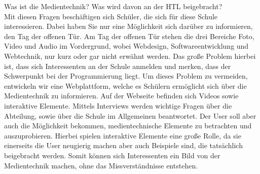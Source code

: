 
Was ist die Medientechnik? Was wird davon an der HTL beigebracht? \\
Mit diesen Fragen beschäftigen sich Schüler, die sich für diese Schule interessieren. Dabei haben Sie nur eine Möglichkeit sich darüber zu informieren, den Tag der offenen Tür. Am Tag der offenen Tür stehen die drei Bereiche Foto, Video und Audio im Vordergrund, wobei Webdesign, Softwareentwicklung und Webtechnik, nur kurz oder gar nicht erwähnt werden. Das große Problem hierbei ist, dass sich Interessenten an der Schule anmelden und merken, dass der Schwerpunkt bei der Programmierung liegt. Um dieses Problem zu vermeiden, entwickeln wir eine Webplattform, welche es Schülern ermöglicht sich über die Medientechnik zu informieren. Auf der Webseite befinden sich Videos sowie interaktive Elemente. Mittels Interviews werden wichtige Fragen über die Abteilung, sowie über die Schule im Allgemeinen beantwortet. Der User soll aber auch die Möglichkeit bekommen, medientechnische Elemente zu betrachten und auszuprobieren. Hierbei spielen interaktive Elemente eine große Rolle, da sie einerseits die User neugierig machen aber auch Beispiele sind, die tatsächlich beigebracht werden. Somit können sich Interessenten ein Bild von der Medientechnik machen, ohne das Missverständnisse entstehen.